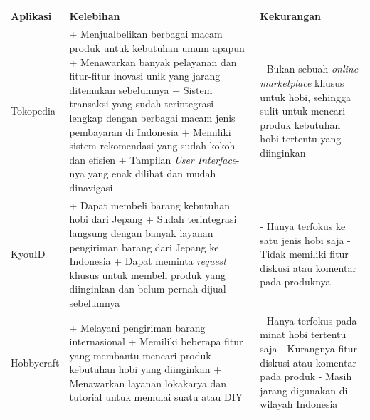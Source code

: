 \documentclass[a4paper]{article}
\begin{document}
\begin{itemize}
    \begin{centering}
        \begin{longtable}{|p{3cm}|p{5cm}|p{5cm}|}
            \hline
            Aplikasi & Kelebihan                                                                                                                 & Kekurangan \\
            \hline
            Tokopedia
                    & + Menjualbelikan berbagai macam produk untuk kebutuhan umum apapun \newline
            + Menawarkan banyak pelayanan dan fitur-fitur inovasi unik yang jarang ditemukan sebelumnya \newline
            + Sistem transaksi yang sudah terintegrasi lengkap dengan berbagai macam jenis pembayaran di Indonesia \newline
            + Memiliki sistem rekomendasi yang sudah kokoh dan efisien \newline
            + Tampilan \textit{User Interface}-nya yang enak dilihat dan mudah dinavigasi \newline
                    & - Bukan sebuah \textit{online marketplace} khusus untuk hobi, sehingga sulit untuk mencari produk kebutuhan hobi tertentu yang diinginkan \\
            \hline
            KyouID
                    & + Dapat membeli barang kebutuhan hobi dari Jepang \newline
                + Sudah terintegrasi langsung dengan banyak layanan pengiriman barang dari Jepang ke Indonesia \newline
                + Dapat meminta \textit{request} khusus untuk membeli produk yang diinginkan dan belum pernah dijual sebelumnya \newline
                    & - Hanya terfokus ke satu jenis hobi saja \newline
                - Tidak memiliki fitur diskusi atau komentar pada produknya                                                                                    \\
            \hline
            Hobbycraft
                    & + Melayani pengiriman barang internasional \newline
            + Memiliki beberapa fitur yang membantu mencari produk kebutuhan hobi yang diinginkan \newline
            + Menawarkan layanan lokakarya dan tutorial untuk memulai suatu  atau DIY \newline
                    & - Hanya terfokus pada minat hobi tertentu saja \newline
                - Kurangnya fitur diskusi atau komentar pada produk
            - Masih jarang digunakan di wilayah Indonesia                                                                                               \\
            \hline
        \end{longtable}
        \end{centering}


\end{itemize}
\end{document}
